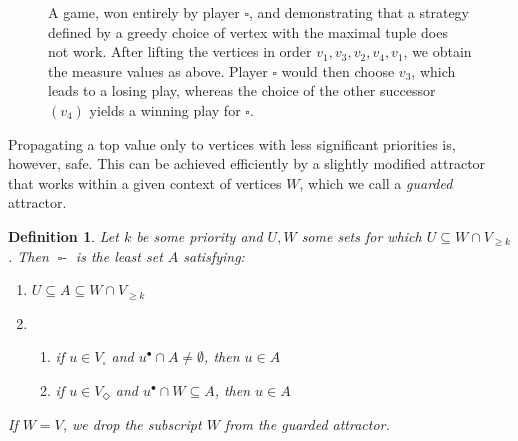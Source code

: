 \documentclass{eptcs}
\newtheorem{defi}{Definition}
\newenvironment{definition}{\begin{defi} \rm }{\end{defi}}
\newcommand{\odd}{\ensuremath{\square}\xspace}
\newcommand{\even}{\ensuremath{\Diamond}\xspace}
\newcommand{\post}[1]{\ensuremath{#1^{\bullet}}}
\newcommand{\attrsym}{\ensuremath{\textit{Attr}}}
\newcommand{\myattrW}[4]{\ensuremath{\mathop{{#2}{\text{-}}\attrsym^{#1}_{#4}(#3)}}}
\begin{document}
\begin{figure}[h!]
\centering
{}
\caption{A game, won entirely by player $\odd$, and demonstrating
that a strategy defined by a greedy choice of vertex with the maximal 
tuple does not work. After lifting the vertices in order $v_1,v_3,v_2,v_4,v_1$, we obtain the measure values as above. Player \odd would then choose $v_3$, which leads to a losing play, whereas the choice of the other successor $(v_4)$ yields a winning play for \odd.}
\label{fig:greedywrong}
\end{figure}


Propagating a top value only to vertices with less significant
priorities is, however, safe. This can be achieved efficiently by
a slightly modified attractor that works within a given context of vertices $W$, 
which we call a \emph{guarded} attractor.
\begin{definition}
Let $k$ be some priority and $U,W$ some sets for which
$U \subseteq W \cap V_{\geq k}$. 
Then $\myattrW{\ge k}{\odd}{U}{W}$ is the least set $A$ satisfying:
\begin{enumerate}
 \item $ U \subseteq A \subseteq W \cap V_{\geq k}$
 
 \item 
 \begin{enumerate}
  \item if $u \in V_{\odd}$ and $\post{u} \cap A \neq \emptyset$, then $u \in A$
  \item if $u \in V_{\even}$ and $\post{u}\cap W \subseteq A$, then $u \in A$
 \end{enumerate}
\end{enumerate}
If $W = V$, we drop the subscript $W$ from the guarded attractor.
\end{definition}
\end{document}
